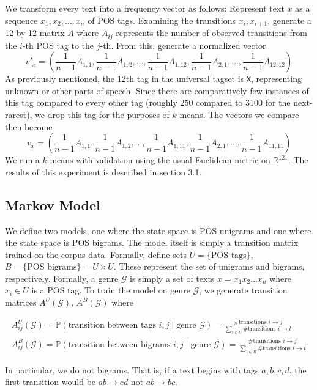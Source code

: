 \documentclass{article}
\begin{document}
We transform every text into a frequency vector as follows: Represent text $x$ as a sequence $x_1, x_2, \dots, x_n$ of POS tags. Examining the transitions $x_i,x_{i+1}$, generate a 12 by 12 matrix $A$ where $A_{ij}$ represents the number of observed transitions from the $i$-th POS tag to the $j$-th. From this, generate a normalized vector
$$v'_x = (\frac{1}{n - 1}A_{1,1}, \frac{1}{n - 1}A_{1,2}, \dots, \frac{1}{n - 1}A_{1,12}, \frac{1}{n - 1}A_{2,1}, \dots, \frac{1}{n - 1}A_{12,12})$$
As previously mentioned, the 12th tag in the universal tagset is \verb|X|, representing unknown or other parts of speech. Since there are comparatively few instances of this tag compared to every other tag (roughly 250 compared to 3100 for the next-rarest), we drop this tag for the purposes of $k$-means. The vectors we compare then become
$$v_x = (\frac{1}{n - 1}A_{1,1}, \frac{1}{n - 1}A_{1,2}, \dots, \frac{1}{n - 1}A_{1,11}, \frac{1}{n - 1}A_{2,1}, \dots, \frac{1}{n - 1}A_{11,11})$$
We run a $k$-means with validation using the usual Euclidean metric on $\mathbb{R}^{121}$. The results of this experiment is described in section 3.1.

\subsection{Markov Model}
We define two models, one where the state space is POS unigrams and one where the state space is POS bigrams. The model itself is simply a transition matrix trained on the corpus data. Formally, define sets $U = \{\text{POS tags}\}$, $B = \{\text{POS bigrams}\} = U \times U$. These represent the set of unigrams and bigrams, respectively. Formally, a genre $\mathcal{G}$ is simply a set of texts $x = x_1 x_2 \dots x_n$ where $x_i \in U$ is a POS tag. To train the model on genre $\mathcal{G}$, we generate transition matrices $A^U(\mathcal{G})$, $A^B(\mathcal{G})$ where

\begin{gather}
A^U_{ij}(\mathcal{G}) = \mathbb{P}(\text{transition between tags } i, j \;|\; \text{genre } \mathcal{G}) = \frac{\text{\# transitions } i \to j}{\underset{t \in U}{\sum}\text{\# transitions } i \to t}\\
A^B_{ij}(\mathcal{G}) = \mathbb{P}(\text{transition between bigrams } i, j \;|\; \text{genre } \mathcal{G}) = \frac{\text{\# transitions } i \to j}{\underset{t \in B}{\sum}\text{\# transitions } i \to t}
\end{gather}

In particular, we do not  bigrams. That is, if a text begins with tags $a,b,c,d$, the first transition would be $ab \to cd$ not $ab \to bc$.
\end{document}
